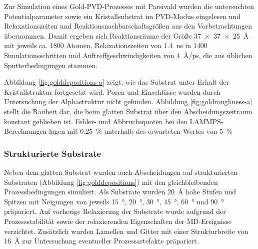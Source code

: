 Zur Simulation eines Gold-PVD-Prozesses mit Parsivald wurden die untersuchten Potentialparameter sowie ein Kristallsubstrat im PVD-Modus eingelesen und Relaxationszeiten und Reaktionsnachbarschaftsgrößen aus den Vorbetrachtungen übernommen.
Damit ergeben sich Reaktionsräume der Größe \SI{37x37x25}{\angstrom} mit jeweils ca. \num{1800} Atomen, Relaxationszeiten von \SI{1.4}{\nano\second} in \num{1400} Simulationsschritten und Auftreffgeschwindigkeiten von \SI{4}{\angstrom/\pico\second}, die aus üblichen Sputterbedingungen stammen.

Abbildung \ref{fig:golddepositions-a} zeigt, wie das Substrat unter Erhalt der Kristallstruktur fortgesetzt wird.
Poren und Einschlüsse wurden durch Untersuchung der Alphastruktur nicht gefunden.
Abbildung \ref{fig:goldroughness-a} stellt die Rauheit dar, die beim glatten Substrat über den Abscheidungszeitraum konstant geblieben ist.
Fehler- und Abbruchsquoten bei den LAMMPS-Berechnungen lagen mit \SI{0.25}{\percent} unterhalb des erwarteten Wertes von \SI{5}{\percent}

\subsubsection{Strukturierte Substrate}

Neben dem glatten Substrat wurden auch Abscheidungen auf strukturierten Substraten (Abbildung \ref{fig:golddepositions}) mit den gleichbleibenden Prozessbedingungen simuliert.
Als Substrate wurden \SI{20}{\angstrom} hohe Stufen und Spitzen mit Neigungen von jeweils \SI{15}{\degree}, \SI{20}{\degree}, \SI{30}{\degree}, \SI{45}{\degree}, \SI{60}{\degree} und \SI{90}{\degree} präpariert.
Auf vorherige Relaxierung der Substrate wurde aufgrund der Prozessstabilität sowie der relaxierenden Eigenschaften der MD-Ereignisse verzichtet.
Zusätzlich wurden Lamellen und Gitter mit einer Strukturbreite von \SI{16}{\angstrom} zur Untersuchung eventueller Prozessartefakte präpariert.

